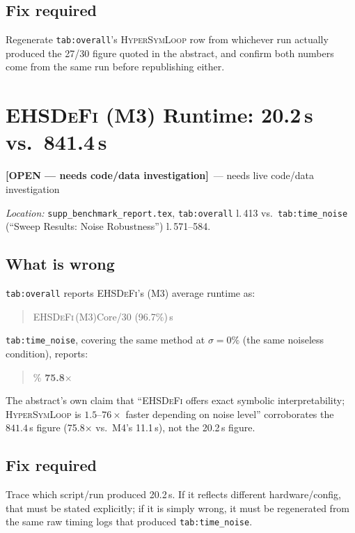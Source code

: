 \documentclass[11pt]{article}
\newcommand{\HSL}{\textsc{HyperSymLoop}}
\newcommand{\EHD}{\textsc{EHSDeFi}}
\newcommand{\open}{\textcolor{red!60!black}{\textbf{[OPEN --- needs code/data investigation]}}}
\newcommand{\loc}[1]{\textit{Location:} #1\par}
\newenvironment{evidence}
  {\begin{quote}\small\ttfamily}
  {\end{quote}}
\begin{document}
\subsection*{Fix required}
Regenerate \texttt{tab:overall}'s \HSL{} row from whichever run actually
produced the 27/30 figure quoted in the abstract, and confirm both numbers
come from the same run before republishing either.

\section{\EHD{} (M3) Runtime: 20.2\,s vs.\ 841.4\,s}
\label{issue:3}
\open\ --- needs live code/data investigation

\loc{\texttt{supp\_benchmark\_report.tex}, \texttt{tab:overall} l.\,413 vs.\
\texttt{tab:time\_noise} (``Sweep Results: Noise Robustness'') l.\,571--584.}

\subsection*{What is wrong}
\texttt{tab:overall} reports \EHD{}'s (M3) average runtime as:
\begin{evidence}
\EHD\,(M3)\quad Core/30 (96.7\%)\,s
\end{evidence}
\texttt{tab:time\_noise}, covering the same method at $\sigma=0\%$ (the same
noiseless condition), reports:
\begin{evidence}
0\%   \quad \textbf{75.8$\times$}
\end{evidence}
The abstract's own claim that ``\EHD{} offers exact symbolic
interpretability; \HSL{} is $1.5$--$76\times$ faster depending on noise
level'' corroborates the $841.4$\,s figure (75.8$\times$ vs.\ M4's 11.1\,s),
not the 20.2\,s figure.

\subsection*{Fix required}
Trace which script/run produced 20.2\,s. If it reflects different
hardware/config, that must be stated explicitly; if it is simply wrong, it
must be regenerated from the same raw timing logs that produced
\texttt{tab:time\_noise}.

\end{document}
